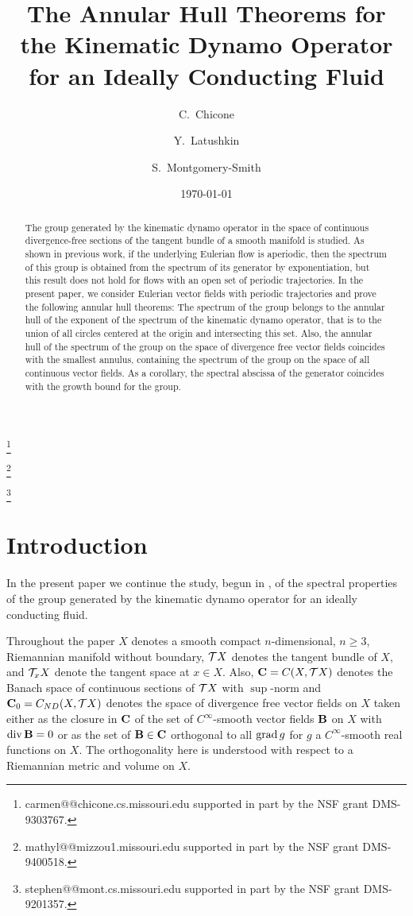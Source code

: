 \title[Annular Hull Theorems]{The Annular Hull Theorems for the 
Kinematic Dynamo Operator\\ for an Ideally Conducting Fluid}
\author{C.~Chicone}
\thanks{carmen@@chicone.cs.missouri.edu  supported in part by
the NSF grant DMS-9303767.}
\author{Y.~Latushkin}
\thanks{mathyl@@mizzou1.missouri.edu supported  in part by the
NSF grant DMS-9400518.}
\author{S.~Montgomery-Smith}
\thanks{stephen@@mont.cs.missouri.edu supported in part by
the NSF grant  DMS-9201357.}
\address{Department of Mathematics, University of Missouri,
Columbia MO 65211}
\date{\today}
\maketitle
\begin{abstract}The group generated by the kinematic dynamo operator 
in the space of continuous divergence-free 
sections of the tangent bundle of a smooth manifold is studied.
As shown in previous work, 
if the underlying Eulerian flow is aperiodic, 
then the spectrum of this group is
obtained from the spectrum of its generator by exponentiation, but
this result does not hold for flows with an open set of  
periodic trajectories. In the present paper, we consider
Eulerian vector fields with periodic trajectories and prove
the following  annular hull theorems:  
The spectrum of the group
belongs to the annular hull of
the exponent of the spectrum of the kinematic dynamo operator, 
that is to the union of 
all circles centered at the origin and intersecting this set. 
Also, the annular hull of the spectrum of the group
on the space of divergence free vector fields
coincides with the smallest annulus, containing the spectrum
of the group on the space of all continuous vector fields.
As a corollary,  the spectral abscissa of the generator 
coincides with the growth bound for the group.


\end{abstract}
\section{Introduction}
In the present paper we continue the study, begun in \cite{clms}, of
the spectral properties of the group generated by the 
kinematic dynamo operator for an ideally conducting fluid.

Throughout the paper 
$X$ denotes a smooth compact $n$-dimensional, $n\geq 3$, 
Riemannian manifold  without boundary, ${\cal{T}} X$ denotes the
tangent bundle of $X$, and ${\cal{T}}_xX$ denote the tangent space at $x\in X$.
Also, ${\bold C}=C(X,{\cal{T}} X)$ denotes the Banach space of continuous
sections of ${\cal{T}} X$ with $\sup$-norm and ${{\bold C}_0}=C_{ND}(X,{\cal{T}} X)$
denotes the space of divergence free
vector fields on $X$ taken either as the closure in ${\bold C}$
of the set of $C^\infty$-smooth vector fields ${\bold B}$ on $X$ with
$\operatorname{div} {\bold B}=0$ or as the set of ${\bold B}\in{\bold C}$ orthogonal to all 
$\operatorname{grad} g$ for $g$ a $C^\infty$-smooth real functions on $X$. 
The orthogonality here
is understood with respect to a Riemannian metric and volume on $X$.


